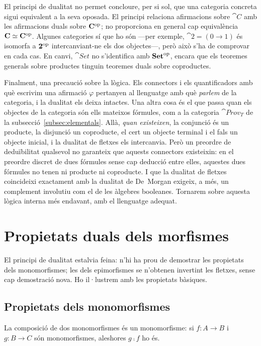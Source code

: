 El principi de dualitat no permet concloure, per si sol, que una categoria concreta sigui equivalent a la seva oposada. El principi relaciona afirmacions sobre $\cat{C}$ amb les afirmacions duals sobre $\mathbf{C}^{\mathrm{op}}$; no proporciona en general cap equivalència $\mathbf{C}\simeq\mathbf{C}^{\mathrm{op}}$. Algunes categories sí que ho són ---per exemple, $\cat{2}=(0\to 1)$ és isomorfa a $\mathbf{2}^{\mathrm{op}}$ intercanviant-ne els dos objectes---, però això s'ha de comprovar en cada cas. En canvi, $\cat{Set}$ no s'identifica amb $\mathbf{Set}^{\mathrm{op}}$, encara que els teoremes generals sobre productes tinguin teoremes duals sobre coproductes.

Finalment, una precaució sobre la lògica. Els connectors i els quantificadors amb què escrivim una afirmació $\varphi$ pertanyen al llenguatge amb què \emph{parlem} de la categoria, i la dualitat els deixa intactes. Una altra cosa és el que passa quan els objectes de la categoria són ells mateixos fórmules, com a la categoria $\cat{Prov}_T$ de la subsecció~\ref{subsec:elementals}. Allà, \emph{quan existeixen}, la conjunció és un producte, la disjunció un coproducte, el cert un objecte terminal i el fals un objecte inicial, i la dualitat de fletxes els intercanvia. Però un preordre de deduïbilitat qualsevol no garanteix que aquests connectors existeixin: en el preordre discret de dues fórmules sense cap deducció entre elles, aquestes dues fórmules no tenen ni producte ni coproducte. I que la dualitat de fletxes coincideixi exactament amb la dualitat de De~Morgan exigeix, a més, un complement involutiu com el de les àlgebres booleanes. Tornarem sobre aquesta lògica interna més endavant, amb el llenguatge adequat.

\section{Propietats duals dels morfismes}\label{sec:propietats-duals}

El principi de dualitat estalvia feina: n'hi ha prou de demostrar les propietats dels monomorfismes; les dels epimorfismes se n'obtenen invertint les fletxes, sense cap demostració nova. Ho il·lustrem amb les propietats bàsiques.

\subsection{Propietats dels monomorfismes}

\begin{proposicio}\label{prop:mono-comp}
La composició de dos monomorfismes és un monomorfisme: si $f\colon A\to B$ i $g\colon B\to C$ són monomorfismes, aleshores $g\comp f$ ho és.
\end{proposicio}

